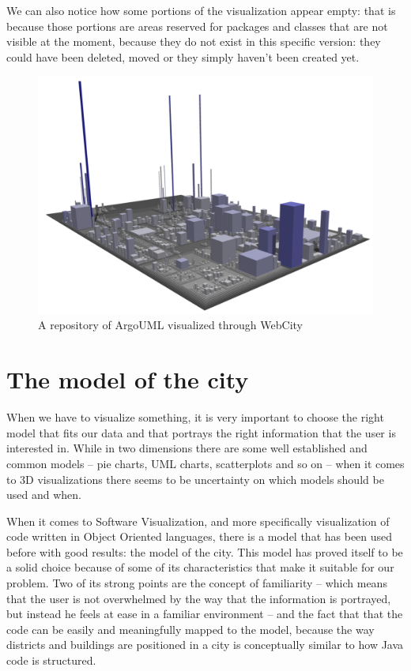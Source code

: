 \documentclass[]{usiinfbachelorproject}
\begin{document}
We can also notice how some portions of the visualization appear empty: that is because those portions are areas reserved for packages and classes that are not visible at the moment, because they do not exist in this specific version: they could have been deleted, moved or they simply haven't been created yet.
\begin{figure} [H]
\centering
\includegraphics[width=.8\textwidth]{pictures/example.png}
\caption{A repository of ArgoUML visualized through WebCity}
\label{fig:example}
\end{figure}


\section{The model of the city} \label{The model of the city}
When we have to visualize something, it is very important to choose the right model that fits our data and that portrays the right information that the user is interested in. While in two dimensions there are some well established and common models -- pie charts, UML charts, scatterplots and so on -- when it comes to 3D visualizations there seems to be uncertainty on which models should be used and when.

When it comes to Software Visualization, and more specifically visualization of code written in Object Oriented languages, there is a model that has been used before \cite{Wett07b} \cite{Wett2008b} \cite{Wett2008a} with good results: the model of the city. This model has proved itself to be a solid choice because of some of its characteristics that make it suitable for our problem. Two of its strong points are the concept of familiarity -- which means that the user is not overwhelmed by the way that the information is portrayed, but instead he feels at ease in a familiar environment -- and the fact that that the code can be easily and meaningfully mapped to the model, because the way districts and buildings are positioned in a city is conceptually similar to how Java code is structured.
\end{document}
